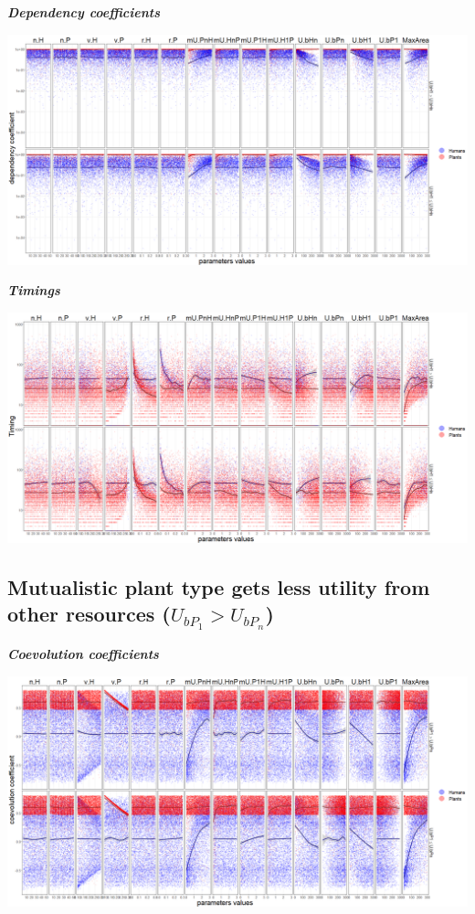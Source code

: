 \documentclass[]{book}
\begin{document}
\textbf{\emph{Dependency coefficients}}

\includegraphics[width=1\linewidth]{plots/5_multiplePar-depend-humanLessBase-ggplot}

\textbf{\emph{Timings}}

\includegraphics[width=1\linewidth]{plots/5_multiplePar-timing-humanLessBase-ggplot}

\newpage

\hypertarget{mutualistic-plant-type-gets-less-utility-from-other-resources-u_bp_1u_bp_n}{%
\subsection{\texorpdfstring{Mutualistic plant type gets less utility from other resources (\(U_{bP_{1}}>U_{bP_{n}}\))}{Mutualistic plant type gets less utility from other resources (U\_\{bP\_\{1\}\}\textgreater{}U\_\{bP\_\{n\}\})}}\label{mutualistic-plant-type-gets-less-utility-from-other-resources-u_bp_1u_bp_n}}


\textbf{\emph{Coevolution coefficients}}

\includegraphics[width=1\linewidth]{plots/5_multiplePar-coevo-plantLessBase-ggplot}
\end{document}
